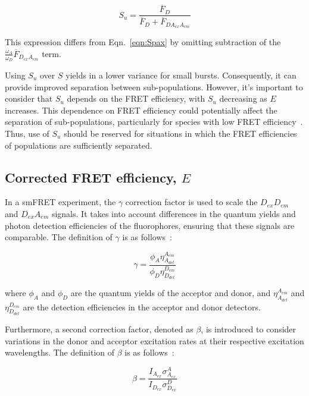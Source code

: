 \begin{equation}
\label{eqn:Su}
S_u = \frac{\overline{F}_{D}}{\overline{F}_{D}+\overline{F}_{DA_{ex}A_{em}}}
\end{equation}

\noindent
This expression differs from Eqn.~\ref{eqn:Spax} by omitting subtraction of the $\frac{\omega_A}{\omega_D} \overline{F}_{D_{ex}A_{em}}$ term.

Using $S_u$ over $S$ yields in a lower variance for small bursts. 
Consequently, it can provide improved separation between sub-populations. 
However, it's important to consider that $S_u$ depends on the FRET efficiency, with $S_u$ decreasing as $E$ increases. 
This dependence on FRET efficiency could potentially affect the separation of sub-populations, particularly for species with low FRET efficiency~\cite{ingargiola_JCP_2018}.
Thus, use of $S_u$ should be reserved for situations in which the FRET efficiencies of populations are sufficiently separated.

\subsection{Corrected FRET efficiency, $E$}
\label{sec:E_apdx}

In a \ac{smFRET} experiment, the $\gamma$ correction factor is used to scale the $D_{ex}D_{em}$ and $D_{ex}A_{em}$ signals. 
It takes into account differences in the quantum yields and photon detection efficiencies of the fluorophores, ensuring that these signals are comparable. 
The definition of $\gamma$ is as follows~\cite{lee_BPJ_2005}:

\begin{equation}
    \label{eqn:gamma}
    \gamma = \frac{\phi_A\eta^{A_{em}}_{A_{det}}}{\phi_D\eta^{D_{em}}_{D_{det}}}
\end{equation}

\noindent
where $\phi_A$ and $\phi_D$ are the quantum yields of the acceptor and donor, and $\eta^{A_{em}}_{A_{det}}$ and $\eta^{D_{em}}_{D_{det}}$ are the detection efficiencies in the acceptor and donor detectors. 

Furthermore, a second correction factor, denoted as $\beta$, is introduced to consider variations in the donor and acceptor excitation rates at their respective excitation wavelengths. 
The definition of $\beta$ is as follows~\cite{lee_BPJ_2005}:

\begin{equation}
    \label{eqn:beta}
    \beta = \frac{I_{A_{ex}}\sigma^{A}_{A_{ex}}}{I_{D_{ex}}\sigma^{D}_{D_{ex}}}
\end{equation}

